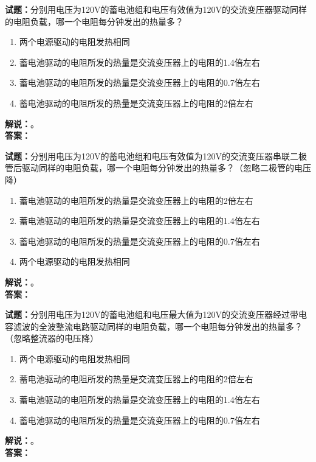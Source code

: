 \documentclass{ctexbook}
\begin{document}
\bigskip

\noindent\textbf{试题：}分别用电压为120V的蓄电池组和电压有效值为120V的交流变压器驱动同样的电阻负载，哪一个电阻每分钟发出的热量多？
\begin{enumerate}[leftmargin=3em]
  \item 两个电源驱动的电阻发热相同
  \item 蓄电池驱动的电阻所发的热量是交流变压器上的电阻的1.4倍左右
  \item 蓄电池驱动的电阻所发的热量是交流变压器上的电阻的0.7倍左右
  \item 蓄电池驱动的电阻所发的热量是交流变压器上的电阻的2倍左右
\end{enumerate}
\noindent\textbf{解说：}\textbf{}。\\\noindent\textbf{答案：}

\bigskip

\noindent\textbf{试题：}分别用电压为120V的蓄电池组和电压有效值为120V的交流变压器串联二极管后驱动同样的电阻负载，哪一个电阻每分钟发出的热量多？（忽略二极管的电压降）
\begin{enumerate}[leftmargin=3em]
  \item 蓄电池驱动的电阻所发的热量是交流变压器上的电阻的2倍左右
  \item 蓄电池驱动的电阻所发的热量是交流变压器上的电阻的1.4倍左右
  \item 蓄电池驱动的电阻所发的热量是交流变压器上的电阻的0.7倍左右
  \item 两个电源驱动的电阻发热相同
\end{enumerate}
\noindent\textbf{解说：}\textbf{}。\\\noindent\textbf{答案：}

\bigskip

\noindent\textbf{试题：}分别用电压为120V的蓄电池组和电压最大值为120V的交流变压器经过带电容滤波的全波整流电路驱动同样的电阻负载，哪一个电阻每分钟发出的热量多？（忽略整流器的电压降）
\begin{enumerate}[leftmargin=3em]
  \item 两个电源驱动的电阻发热相同
  \item 蓄电池驱动的电阻所发的热量是交流变压器上的电阻的2倍左右
  \item 蓄电池驱动的电阻所发的热量是交流变压器上的电阻的1.4倍左右
  \item 蓄电池驱动的电阻所发的热量是交流变压器上的电阻的0.7倍左右
\end{enumerate}
\noindent\textbf{解说：}\textbf{}。\\\noindent\textbf{答案：}
\end{document}
